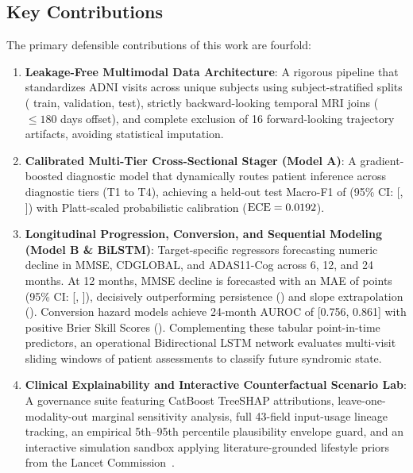 \documentclass[11pt,a4paper]{article}
\begin{document}
\subsection{Key Contributions}
The primary defensible contributions of this work are fourfold:
\begin{enumerate}
    \item \textbf{Leakage-Free Multimodal Data Architecture}: A rigorous pipeline that standardizes \TotalRows{} ADNI visits across \TotalSubjects{} unique subjects using subject-stratified splits (\TrainPct{} train, \ValPct{} validation, \TestPct{} test), strictly backward-looking temporal MRI joins ($\le 180$ days offset), and complete exclusion of 16 forward-looking trajectory artifacts, avoiding statistical imputation.
    \item \textbf{Calibrated Multi-Tier Cross-Sectional Stager (Model A)}: A gradient-boosted diagnostic model that dynamically routes patient inference across diagnostic tiers (T1 to T4), achieving a held-out test Macro-F1 of \StagerTFourFOne{} (95\% CI: [\StagerTFourFCILo{}, \StagerTFourFCIHi{}]) with Platt-scaled probabilistic calibration ($\text{ECE} = 0.0192{}$).
    \item \textbf{Longitudinal Progression, Conversion, and Sequential Modeling (Model B \& BiLSTM)}: Target-specific regressors forecasting numeric decline in MMSE, CDGLOBAL, and ADAS11-Cog across 6, 12, and 24 months. At 12 months, MMSE decline is forecasted with an MAE of \MMSEMAEXII{} points (95\% CI: [\MMSECILoXII{}, \MMSECIHiXII{}]), decisively outperforming persistence (\MMSEPersistXII{}) and slope extrapolation (\MMSESlopeXII{}). Conversion hazard models achieve 24-month AUROC of \ConvAUCXXIV{} [0.756, 0.861] with positive Brier Skill Scores (\ConvBSSXXIV{}). Complementing these tabular point-in-time predictors, an operational Bidirectional LSTM network evaluates multi-visit sliding windows of patient assessments to classify future syndromic state.
    \item \textbf{Clinical Explainability and Interactive Counterfactual Scenario Lab}: A governance suite featuring CatBoost TreeSHAP attributions, leave-one-modality-out marginal sensitivity analysis, full 43-field input-usage lineage tracking, an empirical 5th--95th percentile plausibility envelope guard, and an interactive simulation sandbox applying literature-grounded lifestyle priors from the Lancet Commission~\cite{livingston2024lancet}.
\end{enumerate}


\end{document}

